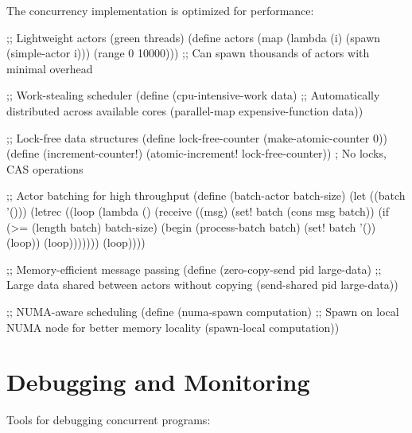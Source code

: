 
The concurrency implementation is optimized for performance:

\begin{example}
\begin{lambdustcode}
;; Lightweight actors (green threads)
(define actors (map (lambda (i) (spawn (simple-actor i))) (range 0 10000)))
;; Can spawn thousands of actors with minimal overhead

;; Work-stealing scheduler
(define (cpu-intensive-work data)
  ;; Automatically distributed across available cores
  (parallel-map expensive-function data))

;; Lock-free data structures  
(define lock-free-counter (make-atomic-counter 0))
(define (increment-counter!)
  (atomic-increment! lock-free-counter))  ; No locks, CAS operations

;; Actor batching for high throughput
(define (batch-actor batch-size)
  (let ((batch '()))
    (letrec ((loop (lambda ()
                     (receive
                       ((msg)
                        (set! batch (cons msg batch))
                        (if (>= (length batch) batch-size)
                            (begin 
                              (process-batch batch)
                              (set! batch '())
                              (loop))
                            (loop)))))))
      (loop))))

;; Memory-efficient message passing
(define (zero-copy-send pid large-data)
  ;; Large data shared between actors without copying
  (send-shared pid large-data))

;; NUMA-aware scheduling  
(define (numa-spawn computation)
  ;; Spawn on local NUMA node for better memory locality
  (spawn-local computation))
\end{lambdustcode}
\end{example}

\section{Debugging and Monitoring}
\label{sec:concurrency-debugging}


Tools for debugging concurrent programs:

